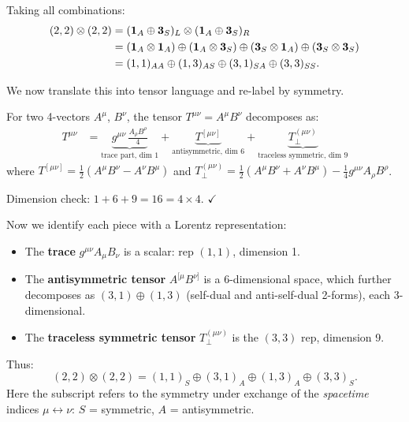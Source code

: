 \documentclass[12pt]{article}
\theoremstyle{remark}
\begin{document}
Taking all combinations:
\begin{align}
  (2,2)\otimes(2,2)
  &= (\mathbf{1}_A \oplus \mathbf{3}_S)_L \otimes (\mathbf{1}_A \oplus \mathbf{3}_S)_R
  \notag\\
  &= (\mathbf{1}_A\otimes\mathbf{1}_A)
     \oplus (\mathbf{1}_A\otimes\mathbf{3}_S)
     \oplus (\mathbf{3}_S\otimes\mathbf{1}_A)
     \oplus (\mathbf{3}_S\otimes\mathbf{3}_S)
  \notag\\
  &= (1,1)_{AA} \oplus (1,3)_{AS} \oplus (3,1)_{SA} \oplus (3,3)_{SS}.
  \label{eq:22x22_raw}
\end{align}

\noindent We now translate this into tensor language and re-label by symmetry.

For two 4-vectors $A^\mu$, $B^\nu$, the tensor $T^{\mu\nu} = A^\mu B^\nu$ decomposes as:
\begin{align}
  T^{\mu\nu}
  &= \underbrace{g^{\mu\nu}\,\frac{A_\rho B^\rho}{4}}_{\text{trace part, dim }1}
   + \underbrace{T^{[\mu\nu]}}_{\text{antisymmetric, dim }6}
   + \underbrace{T^{(\mu\nu)}_\perp}_{\text{traceless symmetric, dim }9}
\end{align}
where $T^{[\mu\nu]} = \tfrac{1}{2}(A^\mu B^\nu - A^\nu B^\mu)$
and $T^{(\mu\nu)}_\perp = \tfrac{1}{2}(A^\mu B^\nu + A^\nu B^\mu) - \tfrac{1}{4}g^{\mu\nu}A_\rho B^\rho$.

Dimension check: $1 + 6 + 9 = 16 = 4\times 4$. $\checkmark$

Now we identify each piece with a Lorentz representation:
\begin{itemize}
  \item The \textbf{trace} $g^{\mu\nu}A_\mu B_\nu$ is a scalar: rep $(1,1)$, dimension 1.
  \item The \textbf{antisymmetric tensor} $A^{[\mu}B^{\nu]}$ is a 6-dimensional space,
        which further decomposes as $(3,1)\oplus(1,3)$ (self-dual and anti-self-dual
        2-forms), each 3-dimensional.
  \item The \textbf{traceless symmetric tensor} $T^{(\mu\nu)}_\perp$ is the $(3,3)$ rep,
        dimension 9.
\end{itemize}

Thus:
\begin{equation}
  \boxed{(2,2)\otimes(2,2) = (1,1)_S \oplus (3,1)_A \oplus (1,3)_A \oplus (3,3)_S.}
  \label{eq:22x22}
\end{equation}
Here the subscript refers to the symmetry under exchange of the \emph{spacetime}
indices $\mu \leftrightarrow \nu$:
$S$ = symmetric, $A$ = antisymmetric.
\end{document}
